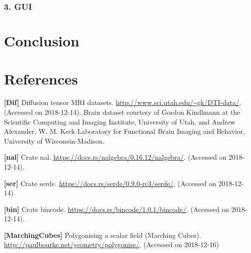 \documentclass{article}
\begin{document}
\subsubsection*{3. GUI}


\section*{Conclusion}


\section*{References}

\textbf{[Dif]}
\label{ref:Dif}
Diffusion tensor MRI datasets. \url{http://www.sci.utah.edu/~gk/DTI-data/}. (Accessed on 2018-12-14). Brain dataset courtesy of Gordon Kindlmann at the Scientific Computing and Imaging Institute, University of Utah, and Andrew Alexander, W. M. Keck Laboratory for Functional Brain Imaging and Behavior, University of Wisconsin-Madison.

\textbf{[nal]}
\label{ref:nal}
Crate nal. \url{https://docs.rs/nalgebra/0.16.12/nalgebra/}. (Accessed on 2018-12-14).

\textbf{[ser]}
\label{ref:ser}
Crate serde. \url{https://docs.rs/serde/0.9.0-rc3/serde/}. (Accessed on 2018-12-14).

\textbf{[bin]}
\label{ref:bin}
Crate bincode. \url{https://docs.rs/bincode/1.0.1/bincode/}. (Accessed on 2018-12-14).

\textbf{[MarchingCubes]}
\label{ref:MarchingCubes}
Polygonising a scalar field (Marching Cubes). \url{http://paulbourke.net/geometry/polygonise/}. (Accessed on 2018-12-16)
\end{document}
